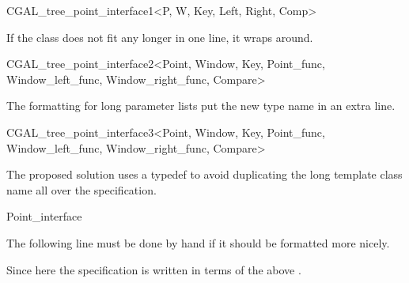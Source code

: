 

\begin{ccClassTemplate}{CGAL_tree_point_interface1<P, W, Key,  
    Left, Right, Comp>}
\end{ccClassTemplate}

If the class does not fit any longer in one line, it wraps around.

\begin{ccClassTemplate}{CGAL_tree_point_interface2<Point, Window, Key,  
         Point_func, Window_left_func, 
         Window_right_func, Compare>}
\end{ccClassTemplate}

The formatting for long parameter lists put the new type name in an extra line.

\begin{ccClassTemplate}{CGAL_tree_point_interface3<Point, Window, Key,  
         Point_func, Window_left_func, 
         Window_right_func, Compare>}
\def\ccLongParamLayout{\ccTrue}
\def\ccLongParamLayout{\ccFalse}
\end{ccClassTemplate}

The proposed solution uses a typedef to avoid duplicating the long
template class name all over the specification.

\begin{ccClass}{Point_interface}
  
The following line must be done by hand if it should be
formatted more nicely.

       
Since here the specification is written in terms of the above
.

\end{ccClass}

